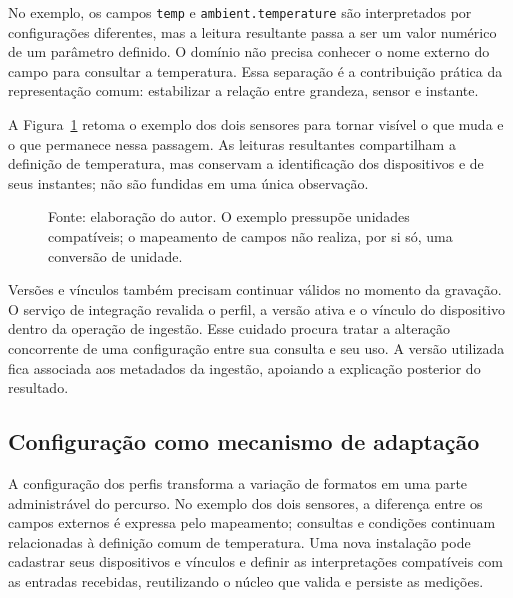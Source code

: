 \documentclass[tcc,capa]{texufpel}
\begin{document}
No exemplo, os campos \texttt{temp} e \texttt{ambient.temperature} são interpretados por configurações diferentes, mas a leitura resultante passa a ser um valor numérico de um parâmetro definido. O domínio não precisa conhecer o nome externo do campo para consultar a temperatura. Essa separação é a contribuição prática da representação comum: estabilizar a relação entre grandeza, sensor e instante.

A Figura~\ref{fig:transformacao-dado} retoma o exemplo dos dois sensores para tornar visível o que muda e o que permanece nessa passagem. As leituras resultantes compartilham a definição de temperatura, mas conservam a identificação dos dispositivos e de seus instantes; não são fundidas em uma única observação.

\begin{figure}[htbp]\centering
\caption{De formatos distintos a medições comparáveis: exemplo hipotético de duas leituras em graus Celsius.}
\label{fig:transformacao-dado}
\par\vspace{5mm}

\par\vspace{3mm}
\caption*{Fonte: elaboração do autor. O exemplo pressupõe unidades compatíveis; o mapeamento de campos não realiza, por si só, uma conversão de unidade.}
\end{figure}

Versões e vínculos também precisam continuar válidos no momento da gravação. O serviço de integração revalida o perfil, a versão ativa e o vínculo do dispositivo dentro da operação de ingestão. Esse cuidado procura tratar a alteração concorrente de uma configuração entre sua consulta e seu uso. A versão utilizada fica associada aos metadados da ingestão, apoiando a explicação posterior do resultado.

\subsection{Configuração como mecanismo de adaptação}
A configuração dos perfis transforma a variação de formatos em uma parte administrável do percurso. No exemplo dos dois sensores, a diferença entre os campos externos é expressa pelo mapeamento; consultas e condições continuam relacionadas à definição comum de temperatura. Uma nova instalação pode cadastrar seus dispositivos e vínculos e definir as interpretações compatíveis com as entradas recebidas, reutilizando o núcleo que valida e persiste as medições.
\end{document}
